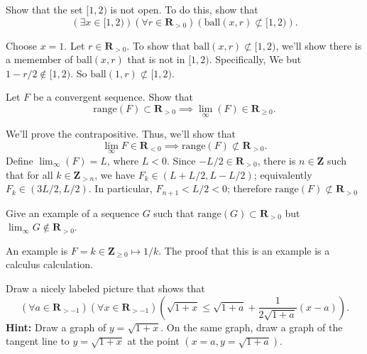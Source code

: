\documentclass[12pt,fleqn,answers]{exam}
\newcommand{\reals}{\mathbf{R}}
\newcommand{\integers}{\mathbf{Z}}
\newcommand{\range}{\mathrm{range}}
\newcommand{\ball}{\mathrm{ball}}
\begin{document}
\begin{questions} 



\question [5] Show that the set $[1,2)$ is not open. To do this, show that
\begin{equation*}
  \left(\exists x \in [1,2) \right) \left(\forall r \in \reals_{>0}\right) \left( \ball(x,r) \not \subset [1,2) \right).
\end{equation*}
\begin{solution}
Choose $x = 1$. Let $r \in \reals_{>0}$. To show 
that $\ball(x,r) \not \subset [1,2)$, we'll show
there is a memember of $\ball(x,r)$ that is not in $[1,2)$. 
Specifically, We
but $1-r/2 \notin [1,2)$. So $\ball(1,r) \not \subset [1,2)$.
  
\end{solution}


\question [5] Let $F$ be a convergent sequence. Show that
\begin{equation*}
  \range(F) \subset \reals_{>0} \implies \lim_{\infty} (F) \in \reals_{\geq 0}.
\end{equation*}

\begin{solution} We'll prove the contrapositive. Thus, we'll show 
  that 
  \begin{equation*}
    \lim_{\infty} F \in \reals_{< 0} \implies \range(F) \not \subset \reals_{>0}.
  \end{equation*}
  Define $\displaystyle \lim_{\infty} (F) = L$, where $L < 0$. Since $-L/2 \in \reals_{>0}$, there is
  $n \in \integers$ such that for all $k \in \integers_{>n}$, we have $F_k  \in (L + L/2, L - L/2)$;
  equivalently  $F_k  \in (3 L/2, L/2)$. In particular, $F_{n+1} < L/2 < 0$; therefore $\range(F) \not \subset 
  \reals_{>0}$

\end{solution}

  


\question [5] Give an example of a sequence $G$ such that $\range(G) \subset \reals_{>0}$ but 
$\displaystyle \lim_{\infty} G \notin \reals_{>  0}$.

\begin{solution} An example is $F = k \in \integers_{\geq 0} \mapsto 1/k$.   The proof that this
is an example is a calculus calculation.
\end{solution}

\question[5] Draw a nicely labeled picture that shows that
\begin{equation*}
  \left(\forall a \in \reals_{>-1}\right)\left(\forall x \in \reals_{>-1}\right) \left(\sqrt{1+x} \leq \sqrt{1+a} + \frac{1}{2 \sqrt{1+a}} (x-a) \right).
\end{equation*}
\textbf{Hint:}  Draw a graph of $y = \sqrt{1+x}$. On the same graph, draw a graph of the tangent line to $y = \sqrt{1+x}$
at the point $(x=a, y=\sqrt{1+a})$.


\end{questions}
\end{document}
